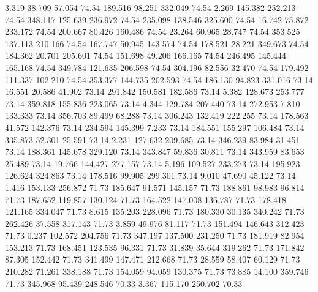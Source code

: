    3.319   38.709   57.054        74.54
 189.516   98.251  332.049        74.54
   2.269  145.382  252.213        74.54
 348.117  125.639  236.972        74.54
 235.098  138.546  325.600        74.54
  16.742   75.872  233.172        74.54
 200.667   80.426  160.486        74.54
  23.264   60.965   28.747        74.54
 353.525  137.113  210.166        74.54
 167.747   50.945  143.574        74.54
 178.521   28.221  349.673        74.54
 184.362   20.701  205.601        74.54
 151.698   49.206  166.165        74.54
 246.495  145.444  165.168        74.54
 349.784  121.635  206.598        74.54
 304.196   82.556   32.470        74.54
 179.492  111.337  102.210        74.54
 353.377  144.735  202.593        74.54
 186.130   94.823  331.016        73.14
  16.551   20.586   41.902        73.14
 291.842  150.581  182.586        73.14
   5.382  128.673  253.777        73.14
 359.818  155.836  223.065        73.14
   4.344  129.784  207.440        73.14
 272.953    7.810  133.333        73.14
 356.703   89.499   68.288        73.14
 306.243  132.419  222.255        73.14
 178.563   41.572  142.376        73.14
 234.594  145.399    7.233        73.14
 184.551  155.297  106.484        73.14
 335.873   52.301   25.591        73.14
   2.231  127.632  209.685        73.14
 346.239   83.984   31.451        73.14
 188.361  145.678  329.120        73.14
 343.847   59.836   30.811        73.14
 343.959   83.653   25.489        73.14
  19.766  144.427  277.157        73.14
   5.196  109.527  233.273        73.14
 195.923  126.624  324.863        73.14
 178.516   99.905  299.301        73.14
   9.010   47.690   45.122        73.14
   1.416  153.133  256.872        71.73
 185.647   91.571  145.157        71.73
 188.861   98.983   96.814        71.73
 187.652  119.857  130.124        71.73
 164.522  147.008  136.787        71.73
 178.418  121.165  334.047        71.73
   8.615  135.203  228.096        71.73
 180.330   30.135  340.242        71.73
 262.426   37.558  317.143        71.73
   3.859   49.976   81.117        71.73
 151.494  146.643  312.423        71.73
   0.237  102.572  204.756        71.73
 347.197  137.500  231.250        71.73
 181.919   82.954  153.213        71.73
 168.451  123.535   96.331        71.73
  31.839   35.644  319.262        71.73
 171.842   87.305  152.442        71.73
 341.499  147.471  212.668        71.73
  28.559   58.407   60.129        71.73
 210.282   71.261  338.188        71.73
 154.059   94.059  130.375        71.73
  73.885   14.100  359.746        71.73
 345.968   95.439  248.546        70.33
   3.367  115.170  250.702        70.33
